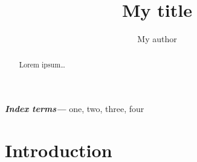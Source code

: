 \documentclass{article}
\title{My title}
\author{My author}
\providecommand{\keywords}[1]{\textbf{\textit{Index terms---}} #1}
\begin{document}
\maketitle
\begin{abstract}
Lorem ipsum\ldots
\end{abstract}
\keywords{one, two, three, four}

\section{Introduction}
\end{document}
